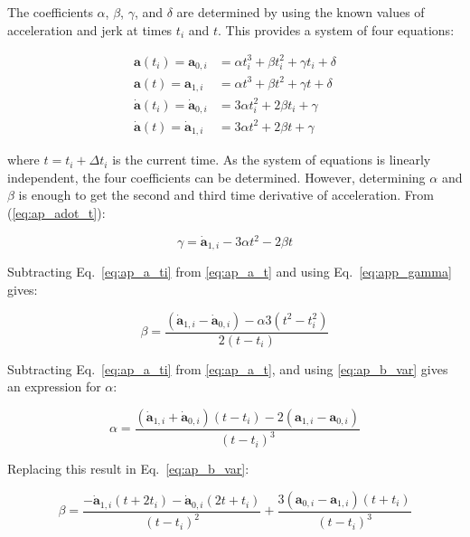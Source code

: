 \begin{appendixs}
	The coefficients $\alpha$, $\beta$, $\gamma$, and $\delta$ are determined by using the known values of acceleration and jerk at times $t_i$ and $t$. This provides a system of four equations:
	
	\begin{align}
		\mathbf{a}(t_i) = \mathbf{a}_{0, i} &=  \alpha t_i^3 + \beta t_i^2 + \gamma t_i + \delta \label{eq:ap_a_ti} \\
		\mathbf{a}(t) = \mathbf{a}_{1, i} &=  \alpha t^3 + \beta t^2 + \gamma t + \delta \label{eq:ap_a_t} \\
		\dot{\mathbf{a}}(t_i) = \dot{\mathbf{a}}_{0, i} &= 3 \alpha t_i^2 + 2 \beta t_i + \gamma \\
		\dot{\mathbf{a}}(t) = \dot{\mathbf{a}}_{1, i} &= 3 \alpha t^2 + 2 \beta t + \gamma \label{eq:ap_adot_t}
	\end{align}
	
	where $t = t_i + \Delta t_i$ is the current time. As the system of equations is linearly independent, the four coefficients can be determined. However, determining $\alpha$ and $\beta$ is enough to get the second and third time derivative of acceleration. From (\ref{eq:ap_adot_t}):
	
	\begin{equation}
		\gamma = \dot{\mathbf{a}}_{1, i} - 3 \alpha t^2 - 2 \beta t \label{eq:app_gamma}
	\end{equation}
	
	Subtracting Eq.~\eqref{eq:ap_a_ti} from \eqref{eq:ap_a_t} and using Eq.~\eqref{eq:app_gamma} gives:
	
	\begin{equation}
		\beta = \frac{(\dot{\mathbf{a}}_{1, i} - \dot{\mathbf{a}}_{0, i}) - \alpha 3 (t^2 - t_i^2)}{2(t - t_i)} \label{eq:ap_b_var}
	\end{equation}
	
	Subtracting Eq.~\eqref{eq:ap_a_ti} from \eqref{eq:ap_a_t}, and using \eqref{eq:ap_b_var} gives an expression for $\alpha$:
	
	\begin{equation}
		\alpha = \frac{(\dot{\mathbf{a}}_{1, i} + \dot{\mathbf{a}}_{0, i})(t - t_i) - 2(\mathbf{a}_{1, i} - \mathbf{a}_{0, i})}{(t - t_i)^3} \label{eq:ap_alpha_var}
	\end{equation}
	
	Replacing this result in Eq.~\eqref{eq:ap_b_var}:
	
	\begin{equation}
		\beta = \frac{-\dot{\mathbf{a}}_{1, i}(t + 2 t_i) - \dot{\mathbf{a}}_{0, i}(2 t + t_i)}{(t - t_i)^2} + \frac{3(\mathbf{a}_{0, i} - \mathbf{a}_{1, i})(t + t_i)}{(t - t_i)^3}
	\end{equation}
	

\end{appendixs}
